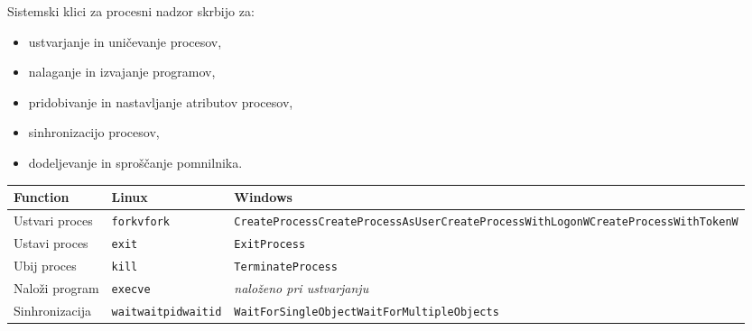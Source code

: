 \documentclass[a4paper,12pt,openright]{book}
\begin{document}
Sistemski klici za procesni nadzor skrbijo za:
\begin{itemize}
	\item ustvarjanje in uničevanje procesov,
	\item nalaganje in izvajanje programov,
	\item pridobivanje in nastavljanje atributov procesov,
	\item sinhronizacijo procesov,
	\item dodeljevanje in sproščanje pomnilnika. \cite{Silberschatz_Galvin_Gagne_2018}
\end{itemize}

\begin{table}[h!]
	\begin{center}
		\begin{tabular}{ p{3.7cm}|p{2.5cm}|p{6cm} }
			Function          & Linux                                                  & Windows                                                                                                                                                                         \\
			\hline
			Ustvari proces    & \verb|fork|\newline\verb|vfork|                        & \verb|CreateProcess|\newline\verb|CreateProcessAsUser|\newline\verb|CreateProcessWithLogonW|\newline\verb|CreateProcessWithTokenW|                                              \\
			Ustavi proces     & \verb|exit|                                            & \verb|ExitProcess|                                                                                                                                                              \\
			Ubij proces       & \verb|kill|                                            & \verb|TerminateProcess|                                                                                                                                                         \\
			Naloži program   & \verb|execve|                                          & \textit{naloženo pri ustvarjanju}                                                                                                                                              \\
			Sinhronizacija    & \verb|wait|\newline\verb|waitpid|\newline\verb|waitid| & \verb|WaitForSingleObject|\newline\verb|WaitForMultipleObjects|                                                                                                                 \\

\end{tabular}
\end{center}
\end{table}
\end{document}

